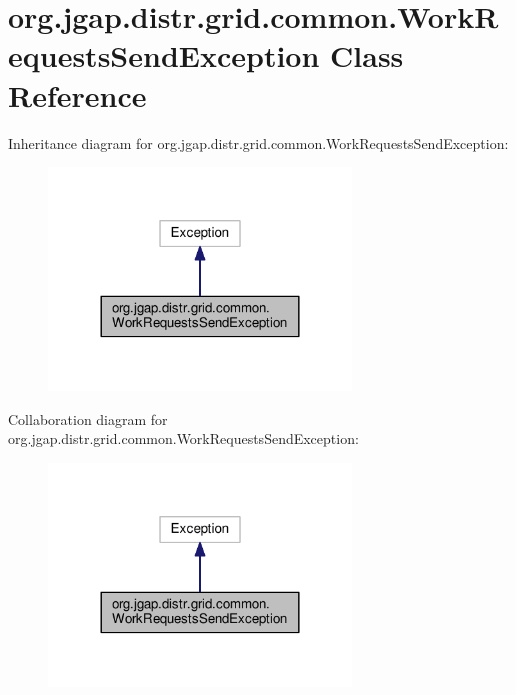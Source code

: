 \hypertarget{classorg_1_1jgap_1_1distr_1_1grid_1_1common_1_1_work_requests_send_exception}{\section{org.\-jgap.\-distr.\-grid.\-common.\-Work\-Requests\-Send\-Exception Class Reference}
\label{classorg_1_1jgap_1_1distr_1_1grid_1_1common_1_1_work_requests_send_exception}
}


Inheritance diagram for org.\-jgap.\-distr.\-grid.\-common.\-Work\-Requests\-Send\-Exception\-:
\nopagebreak
\begin{figure}[H]
\begin{center}
\leavevmode
\includegraphics[width=228pt]{classorg_1_1jgap_1_1distr_1_1grid_1_1common_1_1_work_requests_send_exception__inherit__graph}
\end{center}
\end{figure}


Collaboration diagram for org.\-jgap.\-distr.\-grid.\-common.\-Work\-Requests\-Send\-Exception\-:
\nopagebreak
\begin{figure}[H]
\begin{center}
\leavevmode
\includegraphics[width=228pt]{classorg_1_1jgap_1_1distr_1_1grid_1_1common_1_1_work_requests_send_exception__coll__graph}
\end{center}
\end{figure}

